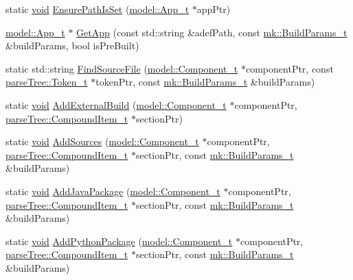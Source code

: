 \begin{DoxyCompactItemize}
\item 
static \hyperlink{_t_e_m_p_l_a_t_e__cdef_8h_ac9c84fa68bbad002983e35ce3663c686}{void} \hyperlink{namespacemodeller_aaee069d7df7527a94062a65ce113aad5}{Ensure\+Path\+Is\+Set} (\hyperlink{structmodel_1_1_app__t}{model\+::\+App\+\_\+t} $\ast$app\+Ptr)
\item 
\hyperlink{structmodel_1_1_app__t}{model\+::\+App\+\_\+t} $\ast$ \hyperlink{namespacemodeller_ace8eadcc3fd390b1f5c1995b185eb501}{Get\+App} (const std\+::string \&adef\+Path, const \hyperlink{structmk_1_1_build_params__t}{mk\+::\+Build\+Params\+\_\+t} \&build\+Params, bool is\+Pre\+Built)
\item 
static std\+::string \hyperlink{namespacemodeller_ac09c157491cc7e9f6fb06053f2f9afea}{Find\+Source\+File} (\hyperlink{structmodel_1_1_component__t}{model\+::\+Component\+\_\+t} $\ast$component\+Ptr, const \hyperlink{structparse_tree_1_1_token__t}{parse\+Tree\+::\+Token\+\_\+t} $\ast$token\+Ptr, const \hyperlink{structmk_1_1_build_params__t}{mk\+::\+Build\+Params\+\_\+t} \&build\+Params)
\item 
static \hyperlink{_t_e_m_p_l_a_t_e__cdef_8h_ac9c84fa68bbad002983e35ce3663c686}{void} \hyperlink{namespacemodeller_a6e05d348bf8f6a039099bf18c3aae44f}{Add\+External\+Build} (\hyperlink{structmodel_1_1_component__t}{model\+::\+Component\+\_\+t} $\ast$component\+Ptr, \hyperlink{structparse_tree_1_1_compound_item__t}{parse\+Tree\+::\+Compound\+Item\+\_\+t} $\ast$section\+Ptr)
\item 
static \hyperlink{_t_e_m_p_l_a_t_e__cdef_8h_ac9c84fa68bbad002983e35ce3663c686}{void} \hyperlink{namespacemodeller_a7dd1222cecc53d79d84cd8ae031e4b0a}{Add\+Sources} (\hyperlink{structmodel_1_1_component__t}{model\+::\+Component\+\_\+t} $\ast$component\+Ptr, \hyperlink{structparse_tree_1_1_compound_item__t}{parse\+Tree\+::\+Compound\+Item\+\_\+t} $\ast$section\+Ptr, const \hyperlink{structmk_1_1_build_params__t}{mk\+::\+Build\+Params\+\_\+t} \&build\+Params)
\item 
static \hyperlink{_t_e_m_p_l_a_t_e__cdef_8h_ac9c84fa68bbad002983e35ce3663c686}{void} \hyperlink{namespacemodeller_a044353c32f67748185a317dc96eca8a8}{Add\+Java\+Package} (\hyperlink{structmodel_1_1_component__t}{model\+::\+Component\+\_\+t} $\ast$component\+Ptr, \hyperlink{structparse_tree_1_1_compound_item__t}{parse\+Tree\+::\+Compound\+Item\+\_\+t} $\ast$section\+Ptr, const \hyperlink{structmk_1_1_build_params__t}{mk\+::\+Build\+Params\+\_\+t} \&build\+Params)
\item 
static \hyperlink{_t_e_m_p_l_a_t_e__cdef_8h_ac9c84fa68bbad002983e35ce3663c686}{void} \hyperlink{namespacemodeller_a24ee9fe6a18bd0b4e63c2e93e2da1695}{Add\+Python\+Package} (\hyperlink{structmodel_1_1_component__t}{model\+::\+Component\+\_\+t} $\ast$component\+Ptr, \hyperlink{structparse_tree_1_1_compound_item__t}{parse\+Tree\+::\+Compound\+Item\+\_\+t} $\ast$section\+Ptr, const \hyperlink{structmk_1_1_build_params__t}{mk\+::\+Build\+Params\+\_\+t} \&build\+Params)

\end{DoxyCompactItemize}
